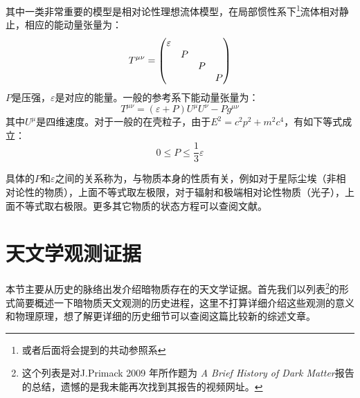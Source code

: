 \documentclass{ctexart}
\newcommand{\dotemph}[1]{\CJKunderdot{#1}}
\begin{document}
	其中一类非常重要的模型是相对论性理想流体模型，在局部惯性系下\footnote{或者后面将会提到的共动参照系}流体相对静止，相应的能动量张量为：
	\begin{equation}
		T^{\mu\nu}=\mqty(\dmat{\varepsilon,P,P,P})
	\end{equation}
	$P$是压强，$\varepsilon$是对应的能量。一般的参考系下能动量张量为：
	\begin{equation}
		\label{eq:17}
		T^{\mu\nu}=(\varepsilon+P)U^\mu U^\nu-Pg^{\mu\nu}
	\end{equation}
	其中$U^\mu$是四维速度。对于一般的在壳粒子，由于$E^2=c^2p^2+m^2c^4$，有如下等式成立：
	\begin{equation}
		\label{eq:18}
		0\leq P\leq \frac{1}{3}\varepsilon
	\end{equation}

	具体的$P$和$\varepsilon$之间的关系称为\dotemph{状态方程}，与物质本身的性质有关，例如对于星际尘埃（非相对论性的物质），上面不等式取左极限，对于辐射和极端相对论性物质（光子），上面不等式取右极限。更多其它物质的状态方程可以查阅文献\cite{Linder1997FirstPO}。
	
	\section{天文学观测证据}
	本节主要从历史的脉络出发介绍暗物质存在的天文学证据。首先我们以列表\footnote{这个列表是对J.Primack 2009 年所作题为 \textit{A Brief History of Dark Matter}报告的总结，遗憾的是我未能再次找到其报告的视频网址。}的形式简要概述一下暗物质天文观测的历史进程，这里不打算详细介绍这些观测的意义和物理原理，想了解更详细的历史细节可以查阅这篇比较新的综述文章\cite{RevModPhys.90.045002}。
	
\end{document}
